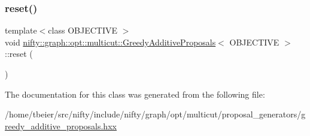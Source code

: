 \mbox{\label{classnifty_1_1graph_1_1opt_1_1multicut_1_1GreedyAdditiveProposals_a039d407722e0ad11b70e420787d89f2b}} 
\subsubsection{\texorpdfstring{reset()}{reset()}}
{\footnotesize\ttfamily template$<$class O\+B\+J\+E\+C\+T\+I\+VE $>$ \\
void \hyperlink{classnifty_1_1graph_1_1opt_1_1multicut_1_1GreedyAdditiveProposals}{nifty\+::graph\+::opt\+::multicut\+::\+Greedy\+Additive\+Proposals}$<$ O\+B\+J\+E\+C\+T\+I\+VE $>$\+::reset (\begin{DoxyParamCaption}{ }\end{DoxyParamCaption})\hspace{0.3cm}{\ttfamily [inline]}}



The documentation for this class was generated from the following file\+:\begin{DoxyCompactItemize}
\item 
/home/tbeier/src/nifty/include/nifty/graph/opt/multicut/proposal\+\_\+generators/\hyperlink{greedy__additive__proposals_8hxx}{greedy\+\_\+additive\+\_\+proposals.\+hxx}\end{DoxyCompactItemize}
